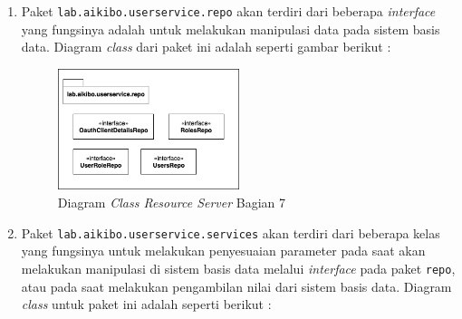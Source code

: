 \documentclass[pdftex,12pt, oneside]{article}
\begin{document}
\begin{enumerate}
	\item Paket \texttt{lab.aikibo.userservice.repo} akan terdiri dari beberapa \textit{interface} yang fungsinya adalah untuk melakukan manipulasi data pada sistem basis data. Diagram \textit{class} dari paket ini adalah seperti gambar berikut :
	
	\begin{figure}[H]
		\centering
		\includegraphics[width=0.5\textwidth]{./resources/class-dia-resource-7}
		\caption{Diagram \textit{Class Resource Server} Bagian 7}
		\label{fig:class-dia-resource-7}
	\end{figure}
	
	\item Paket \texttt{lab.aikibo.userservice.services} akan terdiri dari beberapa kelas yang fungsinya untuk melakukan penyesuaian parameter pada saat akan melakukan manipulasi di sistem basis data melalui \textit{interface} pada paket \texttt{repo}, atau pada saat melakukan pengambilan nilai dari sistem basis data. Diagram \textit{class} untuk paket ini adalah seperti berikut :
	

\end{enumerate}
\end{document}
